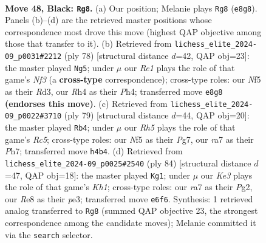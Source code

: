 \documentclass[11pt]{article}
\begin{document}
\clearpage

\begin{figure}[p]\centering
\begin{subfigure}{0.46\textwidth}\centering
\resizebox{\linewidth}{!}{%
\newchessgame
\chessboard[
  setfen={4r3/R7/3pk1p1/5n1p/7r/1p6/3RN1P1/5K2 b - - 3 48},
  showmover=false,
  pgfstyle=straightmove, color=movearrow, markmove={e8-g8}
]}
\caption{}
\end{subfigure}\hfill
\begin{subfigure}{0.46\textwidth}\centering
\resizebox{\linewidth}{!}{%
\newchessgame
\chessboard[
  setfen={6k1/pr4n1/8/7p/7P/1P1R1NP1/1P3P2/6K1 w - - 3 40},
  showmover=false,
  pgfstyle=straightmove, color=movearrow, markmove={f3-g5}
]}
\caption{}
\end{subfigure}
\\[4pt]
\begin{subfigure}{0.46\textwidth}\centering
\resizebox{\linewidth}{!}{%
\newchessgame
\chessboard[
  setfen={8/6pp/4kp2/1Nn5/p1r5/5R1P/6PK/8 b - - 2 40},
  showmover=false,
  pgfstyle=straightmove, color=movearrow, markmove={c4-b4}
]}
\caption{}
\end{subfigure}\hfill
\begin{subfigure}{0.46\textwidth}\centering
\resizebox{\linewidth}{!}{%
\newchessgame
\chessboard[
  setfen={8/r4b2/1NR4p/2P2k2/PP6/4p2P/6P1/7K w - - 0 43},
  showmover=false,
  pgfstyle=straightmove, color=movearrow, markmove={h1-g1}
]}
\caption{}
\end{subfigure}
\caption{\textbf{Move 48, Black: \texttt{Rg8}.} (a) Our position; Melanie plays \texttt{Rg8} (\texttt{e8g8}). Panels (b)--(d) are the retrieved master positions whose correspondence most drove this move (highest QAP objective among those that transfer to it). (b) Retrieved from \texttt{lichess\_elite\_2024-09\_p0031\#2212} (ply 78) [structural distance $d$=42, QAP obj=23]: the master played \texttt{Ng5}; under $\mu$ our \emph{Re1} plays the role of that game's \emph{Nf3} (a \textbf{cross-type} correspondence); cross-type roles: our \emph{N}f5 as their \emph{R}d3, our \emph{R}h4 as their \emph{P}h4; transferred move \texttt{e8g8} \textbf{(endorses this move)}. (c) Retrieved from \texttt{lichess\_elite\_2024-09\_p0022\#3710} (ply 79) [structural distance $d$=44, QAP obj=20]: the master played \texttt{Rb4}; under $\mu$ our \emph{Rh5} plays the role of that game's \emph{Rc5}; cross-type roles: our \emph{N}f5 as their \emph{P}g7, our \emph{r}a7 as their \emph{P}h7; transferred move \texttt{h4b4}. (d) Retrieved from \texttt{lichess\_elite\_2024-09\_p0025\#2540} (ply 84) [structural distance $d$=47, QAP obj=18]: the master played \texttt{Kg1}; under $\mu$ our \emph{Ke3} plays the role of that game's \emph{Kh1}; cross-type roles: our \emph{r}a7 as their \emph{P}g2, our \emph{R}e8 as their \emph{p}e3; transferred move \texttt{e6f6}. Synthesis: 1 retrieved analog transferred to \texttt{Rg8} (summed QAP objective 23, the strongest correspondence among the candidate moves); Melanie committed it via the \texttt{search} selector.}
\label{fig:thought-m95}
\end{figure}
\end{document}
